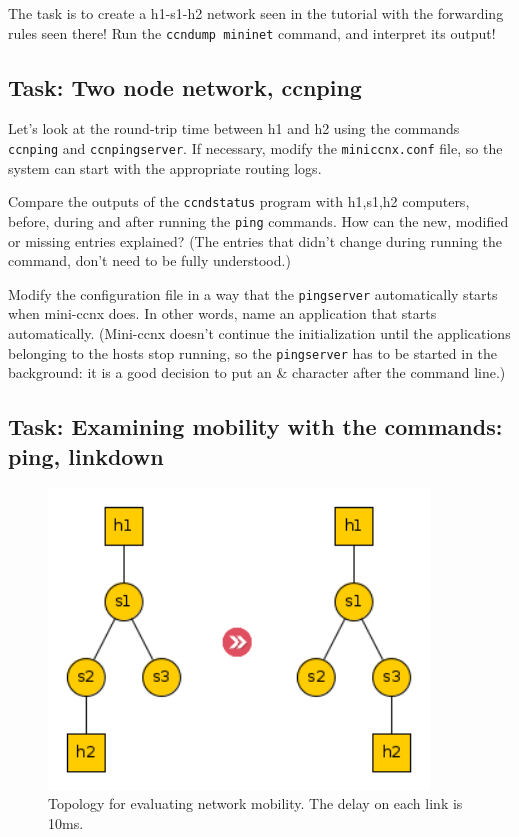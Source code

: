 \documentclass[a4paper]{article}
\begin{document}
The task is to create a h1-s1-h2 network seen in the tutorial with the forwarding rules seen there! Run the
\verb!ccndump mininet! command, and interpret its output!

\subsection{Task: Two node network, ccnping}

Let's look at the round-trip time between h1 and h2 using the commands \verb!ccnping! and \verb!ccnpingserver!.
If necessary, modify the \verb!miniccnx.conf! file, so the system can start with the appropriate routing logs.

Compare the outputs of the \verb!ccndstatus! program with h1,s1,h2 computers, before, during and after running
the \verb!ping! commands. How can the new, modified or missing entries explained? (The entries that didn't
change during running the command, don't need to be fully understood.)

Modify the configuration file in a way that the \verb!pingserver! automatically starts when mini-ccnx does.
In other words, name an application that starts automatically. (Mini-ccnx doesn't continue the 
initialization until the applications belonging to the hosts stop running, so the \verb!pingserver! has to
be started in the background: it is a good decision to put an \& character after the command line.)

\subsection{Task: Examining mobility with the commands: ping, linkdown}

\begin{figure}[H]
    \centering
    \includegraphics[width=0.9\textwidth]{figures/unnamed0.png}
    \caption{Topology for evaluating network mobility. The delay on each link is 10ms.}
    \label{fig:CCN-topo}
\end{figure}
\end{document}

